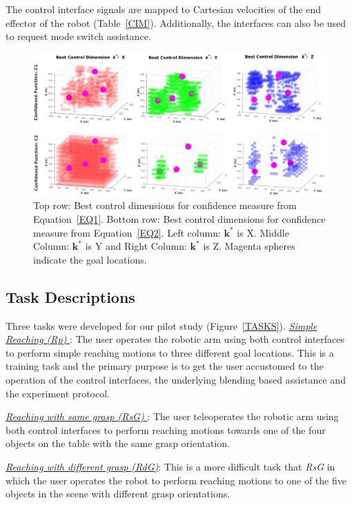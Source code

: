 \documentclass[conference]{IEEEtran}
\begin{document}
The control interface signals are mapped to Cartesian velocities of the end effector of the robot (Table~\ref{CIM}). Additionally, the interfaces can also be used to request mode switch assistance. 
\begin{figure}[ht]
	\centering
	\includegraphics[width = 0.9\hsize, height = 0.6\vsize]{./figures/POINT_CLOUD.png}
	\caption{Top row: Best control dimensions for confidence measure from Equation~\ref{EQ1}. Bottom row: Best control dimensions for confidence measure from Equation~\ref{EQ2}. Left column: $\boldsymbol{k}^*$ is X. Middle Column: $\boldsymbol{k}^*$ is Y and Right Column: $\boldsymbol{k}^*$ is Z. Magenta spheres indicate the goal locations.}
	\label{HM_SEP}
\end{figure}
\subsection{Task Descriptions}
Three tasks were developed for our pilot study (Figure~\ref{TASKS}).
\noindent\underline{\textit{Simple Reaching (Rp)} }: The user operates the robotic arm using both control interfaces to perform simple reaching motions to three different goal locations. This is a training task and the primary purpose is to get the user accustomed to the operation of the control interfaces, the underlying blending based assistance and the experiment protocol. 

\noindent\underline{\textit{Reaching with same grasp (RsG)} }: The user teleoperates the robotic arm using both control interfaces to perform reaching motions towards one of the four objects on the table with the same grasp orientation.

\noindent\underline{\textit{Reaching with different grasp (RdG)}}: This is a more difficult task that \textit{RsG} in which the user operates the robot to perform reaching motions to one of the five objects in the scene with different grasp orientations.
\end{document}
